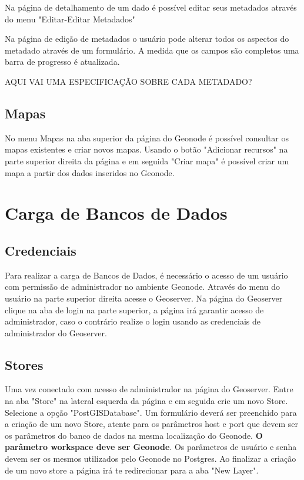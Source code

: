 \documentclass[12pt]{article}
\begin{document}
Na página de detalhamento de um dado é possível editar seus metadados
através do menu "Editar-Editar Metadados"

Na página de edição de metadados o usuário pode alterar todos os aspectos do
metadado através de um formulário. A medida que os campos são completos uma
barra de progresso é atualizada. 

AQUI VAI UMA ESPECIFICAÇÃO SOBRE CADA METADADO?

\subsection{Mapas}

No menu Mapas na aba superior da página do Geonode é possível consultar os
mapas existentes e criar novos mapas. Usando o botão "Adicionar recursos" na
parte superior direita da página e em seguida "Criar mapa" é possível criar um
mapa a partir dos dados inseridos no Geonode.

\section{Carga de Bancos de Dados}

\subsection{Credenciais}
Para realizar a carga de Bancos de Dados, é necessário o acesso de um usuário
com permissão de administrador no ambiente Geonode. Através do menu do usuário
na parte superior direita acesse o Geoserver. Na página do Geoserver clique na
aba de login na parte superior, a página irá garantir acesso de administrador,
caso o contrário realize o login usando as credenciais de administrador do
Geoserver.

\subsection{Stores}
Uma vez conectado com acesso de administrador na página do Geoserver. Entre na
aba "Store" na lateral esquerda da página e em seguida crie um novo Store.
Selecione a opção "PostGISDatabase". Um formulário deverá ser preenchido para a
criação de um novo Store, atente para os parâmetros host e port que devem ser
os parâmetros do banco de dados na mesma localização do Geonode. \textbf{O
parâmetro workspace deve ser Geonode}. Os parâmetros de usuário e senha devem
ser os mesmos utilizados pelo Geonode no Postgres. Ao finalizar a criação de um
novo store a página irá te redirecionar para a aba "New Layer".
\end{document}
